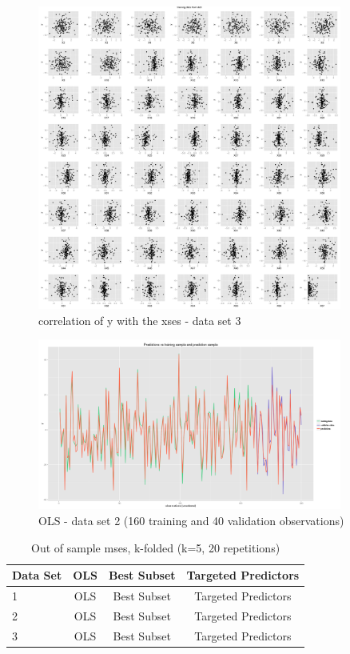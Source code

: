 \documentclass[11pt]{article}
\begin{document}
\begin{figure}
\caption{correlation of y with the xses - data set 3}
\label{correlograms3}
\centering
\includegraphics[width=100mm]{graphs/correlograms3.pdf}
\end{figure}

\begin{figure}
\caption{OLS - data set 2 (160 training and 40 validation observations)}
\label{ols2}
\centering
\includegraphics[width=100mm]{graphs/ols2_validation.png}
\end{figure}

\begin{table}[hc]
\caption{Out of sample mses, k-folded (k=5, 20 repetitions)}
\label{mses kfolded}
\begin{tabular}{l|ccc}
Data Set & OLS & Best Subset & Targeted Predictors \\
\hline
1 & OLS & Best Subset & Targeted Predictors \\
2 & OLS & Best Subset & Targeted Predictors \\
3 & OLS & Best Subset & Targeted Predictors \\

\end{tabular}
\end{table}
\end{document}
